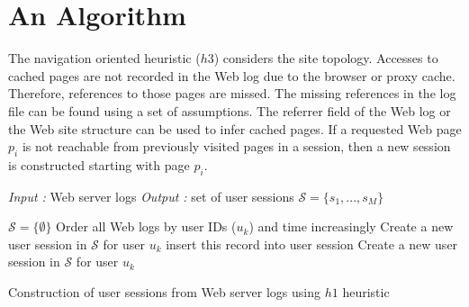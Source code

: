 

\chapter{An Algorithm}
\label{ch03}

The navigation oriented heuristic ($h3$) considers the site topology.
Accesses to cached pages are not recorded in the
Web log due to the browser or proxy cache.
Therefore, references to those pages are missed.
The missing references in the log file can be found using a set of
assumptions.
The referrer field of the Web log or the Web site structure can be used
to infer cached pages.
If a requested Web page $p_i$ is not reachable
from previously visited pages in a
session, then a new session is constructed starting with page $p_i$.

\begin{algorithm}
\hrulefill

 \textit{Input :} Web server logs \newline
 \textit {Output :} set of user sessions
$\mathcal{S}=\{s_{1},...,s_{M}\}$

\hrulefill

\begin{algorithmic}[1]
 \STATE $\mathcal{S}=\{\emptyset\}$
 \STATE Order all Web logs by user IDs ($u_k$) and time increasingly
    \STATE Create a new user session in $\mathcal{S}$ for user $u_k$
    		\STATE insert this record into user session
    	\ELSE
    		\STATE Create a new user session in $\mathcal{S}$ for user $u_k$
    	\ENDIF
    \ENDFOR
 \ENDFOR
\end{algorithmic}
\hrulefill
 \caption{Construction of user sessions from Web server logs using $h1$
 heuristic}
\label{alg:visitingTimeAlg}
\end{algorithm}

\clearpage

